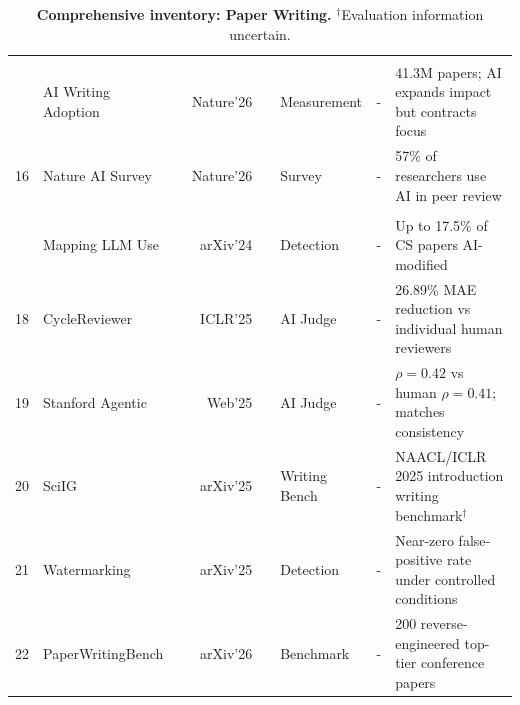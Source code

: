 \documentclass{llmxive}
\providecommand{\levelbadge}[2]{  \tcbox[on line, nobeforeafter, tcbox raise base,
         boxsep=0pt, left=2pt, right=2pt, top=0.5pt, bottom=0.5pt,
         arc=1.5pt, boxrule=0.3pt,
         colback=#1!15, colframe=#1!70]    {\scriptsize\bfseries\sffamily#2}}
\providecommand{\Sfive}{\texorpdfstring{\levelbadge{S5color}{S5}}{S5}\xspace}
\begin{document}
\begin{table}[!ht]
{\begin{tabular}{c| >{\centering\arraybackslash}p{3cm} r r |c| >{\centering\arraybackslash}p{2.5cm} |c| p{7.2cm}}
\addlinespace[3pt]
\multicolumn{8}{@{}l}{\cellcolor{S5color!65}\textbf{\textsf{~~Societal Analysis}}} \\
\addlinespace[1pt]
{15} & AI Writing Adoption & \cite{aicontractfocus2025} & {\small Nature'26} & \href{https://www.nature.com/articles/s41586-025-08681-8}{} & Measurement      & -                                                                     & 41.3M papers; AI expands impact but contracts focus \\
{16} & Nature AI Survey & \cite{aireviewsurvey2025} & {\small Nature'26} & \href{https://www.nature.com/articles/d41586-025-04066-5}{} & Survey           & -                                                                     & 57\% of researchers use AI in peer review \\
\addlinespace[3pt]
\multicolumn{8}{@{}l}{\cellcolor{S5color!65}\textbf{\textsf{~~Writing Quality and AI Detection Assessment}}} \\
\addlinespace[1pt]
{17} & Mapping LLM Use & \cite{liang2024mapping} & {\small arXiv'24} & \href{https://arxiv.org/abs/2404.01268}{} & Detection        & -                                                                     & Up to 17.5\% of CS papers AI-modified \\
{18} & CycleReviewer & \cite{cycleresearcher2024} & {\small ICLR'25} & \href{https://arxiv.org/abs/2411.00816}{} & AI Judge         & -                                                                     & 26.89\% MAE reduction vs individual human reviewers \\
{19} & Stanford Agentic & \cite{stanfordreviewer2025} & {\small Web'25} & \href{https://paperreview.ai/tech-overview}{} & AI Judge         & -                                                                     & $\rho=0.42$ vs human $\rho=0.41$; matches consistency \\
{20} & SciIG & \cite{sciig2025} & {\small arXiv'25} & \href{https://arxiv.org/abs/2508.14273}{} & Writing Bench    & -                                                                     & NAACL/ICLR 2025 introduction writing benchmark$^\dagger$ \\
{21} & Watermarking & \cite{watermarking2025} & {\small arXiv'25} & \href{https://arxiv.org/abs/2503.15772}{} & Detection        & -                                                                     & Near-zero false-positive rate under controlled conditions \\
{22} & PaperWritingBench & \cite{paperwritingbench2026} & {\small arXiv'26} & \href{https://arxiv.org/abs/2604.05018}{} & Benchmark        & -                                                                     & 200 reverse-engineered top-tier conference papers \\
\bottomrule
\end{tabular}}
\caption{\textbf{Comprehensive inventory: \Sfive Paper Writing.} $^\dagger$Evaluation information uncertain.}
\end{table}
\endgroup
\end{document}
